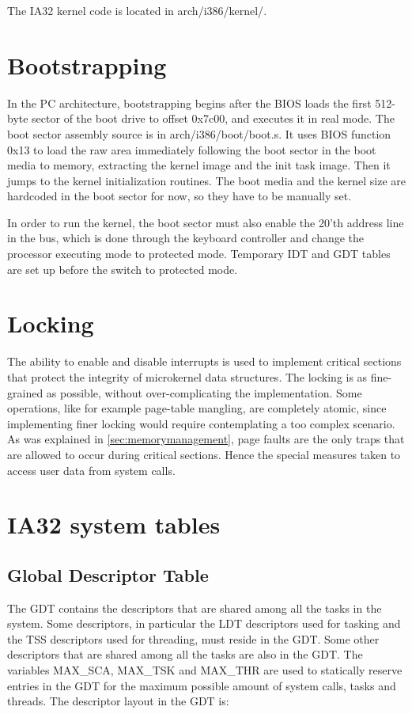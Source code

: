\documentclass[11pt, letterpaper, twoside, english]{book}
\begin{document}
The IA32 kernel code is located in \textsf{arch/i386/kernel/}.

\section{Bootstrapping}

In the PC architecture, bootstrapping begins after the BIOS loads the first 512-byte sector of the boot drive to offset 0x7c00, and executes it in real mode. The boot sector assembly source is in \textsf{arch/i386/boot/boot.s}. It uses BIOS function 0x13 to load the raw area immediately following the boot sector in the boot media to memory, extracting the kernel image and the init task image. Then it jumps to the kernel initialization routines. The boot media and the kernel size are hardcoded in the boot sector for now, so they have to be manually set.

In order to run the kernel, the boot sector must also enable the 20'th address line in the bus, which is done through the keyboard controller and change the processor executing mode to protected mode. Temporary IDT and GDT tables are set up before the switch to protected mode.

\section{Locking}

The ability to enable and disable interrupts is used to implement critical sections that protect the integrity of microkernel data structures. The locking is as fine-grained as possible, without over-complicating the implementation. Some operations, like for example page-table mangling, are completely atomic, since implementing finer locking would require contemplating a too complex scenario. As was explained in \ref{sec:memorymanagement}, page faults are the only traps that are allowed to occur during critical sections. Hence the special measures taken to access user data from system calls.

\section{IA32 system tables}

\subsection{Global Descriptor Table}  \label{subsec:GDT}

The GDT contains the descriptors that are shared among all the tasks in the system. Some descriptors, in particular the LDT descriptors used for tasking and the TSS descriptors used for threading, must reside in the GDT. Some other descriptors that are shared among all the tasks are also in the GDT. The variables \textsf{MAX\_SCA}, \textsf{MAX\_TSK} and \textsf{MAX\_THR} are used to statically reserve entries in the GDT for the maximum possible amount of system calls, tasks and threads. The descriptor layout in the GDT is: \\
\\
\end{document}
